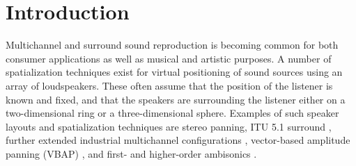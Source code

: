 \documentclass[twoside,10pt]{article}
\title{\papertitle}
\begin{document}
    
\maketitle




%
%


\begin{abstract}
Most common techniques for spatialization require the listener to be positioned at a ``sweet spot'' surrounded by loudspeakers. For practical concert, stage, and installation applications such layouts may not be desirable. Distance-Based Amplitude Panning (DBAP) offers an alternative panning-based spatialization method where no assumptions are made concerning the layout of the speaker array nor the position of the listener.  DBAP is implemented both as an external for Max/MSP and as a module for the Jamoma Modular framework.
\end{abstract}








%
%


\section{Introduction}\label{sec:introduction}

Multichannel and surround sound reproduction is becoming common for both consumer applications as well as musical and artistic purposes. A number of spatialization techniques exist for virtual positioning of sound sources using an array of loudspeakers. These often assume that the position of the listener is known and fixed, and that the speakers are surrounding the listener either on a two-dimensional ring or a three-dimensional sphere. Examples of such speaker layouts and spatialization techniques are stereo panning, ITU 5.1 surround \cite{ITU:1993_surround_5:1}, further extended industrial multichannel configurations \cite{Rumsey:2001spatial_audio}, vector-based amplitude panning (VBAP) \cite{Pulkki:1997vbap}, and first- and higher-order ambisonics \cite{Gerzon:1974surround, Poletti:2000holographic_sound}.
\end{document}
